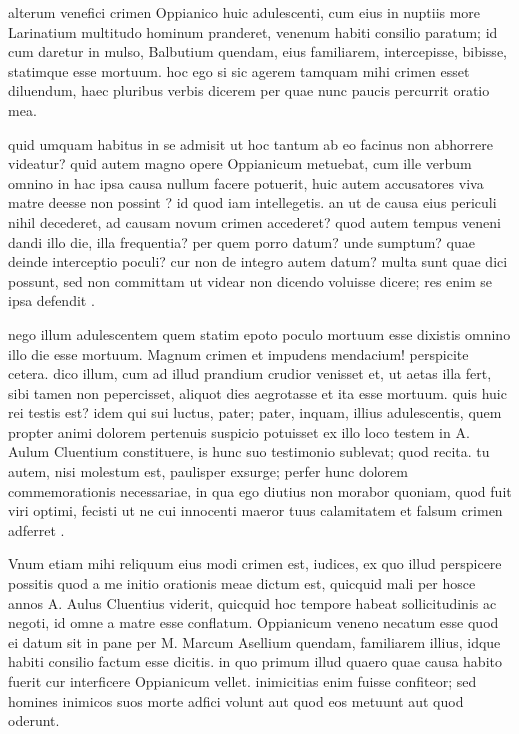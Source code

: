  alterum venefici crimen Oppianico huic adulescenti, cum eius in nuptiis more Larinatium multitudo hominum pranderet, venenum habiti consilio paratum; id cum daretur in mulso, Balbutium quendam, eius familiarem, intercepisse, bibisse, statimque esse mortuum. hoc ego si sic agerem tamquam mihi crimen esset diluendum, haec pluribus verbis dicerem per quae nunc paucis percurrit oratio mea.

 quid umquam habitus in se admisit ut hoc tantum ab eo facinus non abhorrere videatur? quid autem magno opere Oppianicum metuebat, cum ille verbum omnino in hac ipsa causa nullum facere potuerit, huic autem accusatores viva matre deesse non possint ? id quod iam intellegetis. an ut de causa eius periculi nihil decederet, ad causam novum crimen accederet? quod autem tempus veneni dandi illo die, illa frequentia? per quem porro datum? unde sumptum? quae deinde interceptio poculi? cur non de integro autem datum? multa sunt quae dici possunt, sed non committam ut videar non dicendo voluisse dicere; res enim se ipsa defendit .

 nego illum adulescentem quem statim epoto poculo mortuum esse dixistis omnino illo die esse mortuum. Magnum crimen et impudens mendacium! perspicite cetera. dico illum, cum ad illud prandium crudior venisset et, ut aetas illa fert, sibi tamen non pepercisset, aliquot dies aegrotasse et ita esse mortuum. quis huic rei testis est? idem qui sui luctus, pater; pater, inquam, illius adulescentis, quem propter animi dolorem pertenuis suspicio potuisset ex illo loco testem in A. Aulum Cluentium constituere, is hunc suo testimonio sublevat; quod recita. tu autem, nisi molestum est, paulisper exsurge; perfer hunc dolorem commemorationis necessariae, in qua ego diutius non morabor quoniam, quod fuit viri optimi, fecisti ut ne cui innocenti maeror tuus calamitatem et falsum crimen adferret .

 Vnum etiam mihi reliquum eius modi crimen est, iudices, ex quo illud perspicere possitis quod a me initio orationis meae dictum est, quicquid mali per hosce annos A. Aulus Cluentius viderit, quicquid hoc tempore habeat sollicitudinis ac negoti, id omne a matre esse conflatum. Oppianicum veneno necatum esse quod ei datum sit in pane per M. Marcum Asellium quendam, familiarem illius, idque habiti consilio factum esse dicitis. in quo primum illud quaero quae causa habito fuerit cur interficere Oppianicum vellet. inimicitias enim fuisse confiteor; sed homines inimicos suos morte adfici volunt aut quod eos metuunt aut quod oderunt.

